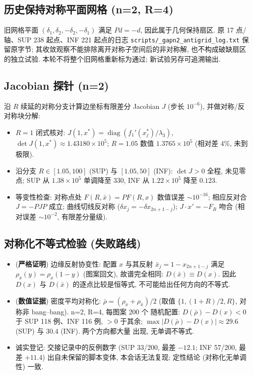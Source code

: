 \documentclass[UTF8]{ctexart}
\newcommand{\STRICT}{\textbf{严格证明}}
\newcommand{\EVIDENCE}{\textbf{数值证据}}
\begin{document}
\subsection{历史保持对称平面网格 (n=2, R=4)}

旧网格平面 $(\delta_1,\delta_2,-\delta_2,-\delta_1)$ 满足 $Pd=-d$,
因此属于几何保持扇区. 原 17 点/轴、SUP 238 起点、INF 221 起点的日志
\texttt{scripts/\_gapn2\_antigrid\_log.txt} 保留原字节;
其收敛观察不能排除离开对称子空间后的非对称解, 也不构成破缺扇区的独立试验.
本轮不将整个旧网格重新标为通过; 新试验另存可追溯输出.

\subsection{Jacobian 探针 (n=2)}

沿 $R$ 续延的对称分支计算边坐标有限差分 Jacobian $J$ (步长 $10^{-6}$),
并做对称/反对称块分解:
\begin{itemize}
	\item $R=1$ 闭式核对: $J(1,x^*)=\operatorname{diag}(f_1'(x_j^*)/\lambda_3)$,
	$\det J(1,x^*)\approx1.43180\times10^5$; $R=1.05$ 数值
	$1.3765\times10^5$ (相对差 $4\%$, 未到极限).
	\item 沿分支 $R\in[1.05,100]$ (SUP) 与 $[1.05,50]$ (INF):
	$\det J>0$ 全程, 未见零点; SUP 从 $1.38\times10^5$ 单调降至 $330$,
	INF 从 $1.22\times10^5$ 降至 $0.123$.
	\item 等变性检查: 对称点处 $F(R,\bar x)=PF(R,x)$ 数值误差 $\sim10^{-16}$;
	相应反对合 $J=-PJP$ 成立; 曲线切线反对称 ($\delta x_j=-\delta x_{2n+1-j}$);
	$J\cdot x'=-F_R$ 吻合 (相对误差 $\sim10^{-2}$, 有限差分量级).
\end{itemize}

\subsection{对称化不等式检验 (失败路线)}

\begin{itemize}
	\item (\STRICT) 边缘反射协变性: 配置 $x$ 与其反射 $\bar x_j=1-x_{2n+1-j}$
	满足 $\rho_{\bar x}(y)=\rho_x(1-y)$ (图案回文), 故谱完全相同:
	$D(\bar x)\equiv D(x)$. 因此 $D(x)$ 与 $D(\bar x)$ 的逐点比较是恒等式,
	不可能给出任何方向的不等式.
	\item (\EVIDENCE) 密度平均对称化: $\bar\rho=(\rho_x+\rho_{\bar x})/2$
	(取值 $\{1,(1+R)/2,R\}$, 对称非 bang--bang). n=2, R=4, 每图案 200 个
	随机配置: $D(\bar\rho)-D(x)<0$ 于 SUP 118 例、INF 116 例, $>0$ 于其余;
	$\max|D(\bar\rho)-D(x)|\approx29.6$ (SUP) 与 $30.4$ (INF). 两个方向都大量
	出现, 无单调不等式.
	\item 诚实登记: 交接记录中的反例数字 (SUP 33/200, 最差 $-12.1$; INF
	57/200, 最差 $+11.4$) 出自未保留的脚本变体, 本会话无法复现; 定性结论
	(对称化无单调性) 一致.
\end{itemize}
\end{document}
